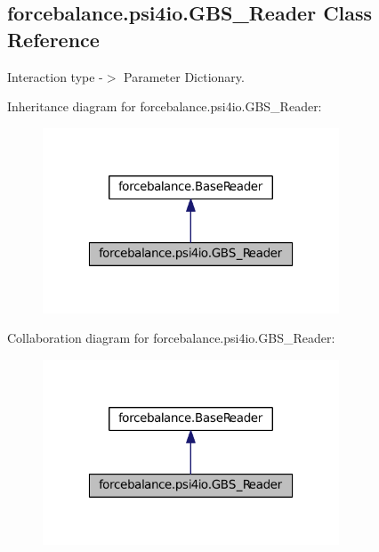 \hypertarget{classforcebalance_1_1psi4io_1_1GBS__Reader}{\subsection{forcebalance.\-psi4io.\-G\-B\-S\-\_\-\-Reader \-Class \-Reference}
\label{classforcebalance_1_1psi4io_1_1GBS__Reader}
}


\-Interaction type -\/$>$ \-Parameter \-Dictionary.  




\-Inheritance diagram for forcebalance.\-psi4io.\-G\-B\-S\-\_\-\-Reader\-:
\nopagebreak
\begin{figure}[H]
\begin{center}
\leavevmode
\includegraphics[width=250pt]{classforcebalance_1_1psi4io_1_1GBS__Reader__inherit__graph}
\end{center}
\end{figure}


\-Collaboration diagram for forcebalance.\-psi4io.\-G\-B\-S\-\_\-\-Reader\-:
\nopagebreak
\begin{figure}[H]
\begin{center}
\leavevmode
\includegraphics[width=250pt]{classforcebalance_1_1psi4io_1_1GBS__Reader__coll__graph}
\end{center}
\end{figure}
